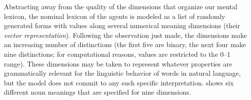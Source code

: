 \documentclass[output=paper]{LSP/langsci}
\begin{document}
Abstracting away from the quality of the dimensions that organize our mental lexicon, the nominal lexicon of the agents is modeled as a list of randomly generated forms with values along several numerical meaning dimensions (their \textit{vector representation}). Following the observation just made, the dimensions make an increasing number of distinctions (the first five are binary, the next four make nine distinctions; for computational reasons, values are restricted to the 0--1 range). These dimensions may be taken to represent whatever properties are grammatically relevant for the linguistic behavior of words in natural language, but the model does not commit to any such specific interpretation.  shows six different noun meanings that are specified for nine dimensions. 

\begin{table}
\caption{First entries in the noun lexicon}\label{17-le-tab:1}
\end{table}
\end{document}
